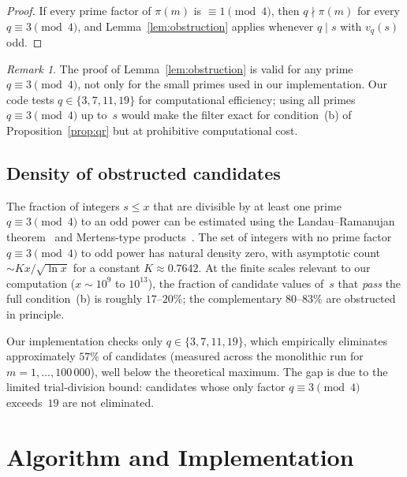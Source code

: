\documentclass{amsart}
\theoremstyle{definition}
\theoremstyle{remark}
\newtheorem{remark}[theorem]{Remark}
\numberwithin{equation}{section}
\newcommand{\vq}[1]{v_{#1}}
\begin{document}
\begin{proof}
If every prime factor of $\pi(m)$ is $\equiv 1 \pmod{4}$, then
$q \nmid \pi(m)$ for every $q \equiv 3 \pmod{4}$, and
Lemma~\ref{lem:obstruction} applies whenever $q \mid s$ with
$\vq{q}(s)$ odd.
\end{proof}

\begin{remark}\label{rem:filter_general}
The proof of Lemma~\ref{lem:obstruction} is valid for any prime
$q \equiv 3 \pmod{4}$, not only for the small primes used in our
implementation.  Our code tests $q \in \{3, 7, 11, 19\}$ for
computational efficiency; using all primes $q \equiv 3 \pmod{4}$
up to~$s$ would make the filter exact for condition~(b) of
Proposition~\ref{prop:qr} but at prohibitive computational cost.
\end{remark}

\subsection{Density of obstructed candidates}

The fraction of integers $s \le x$ that are divisible by at
least one prime $q \equiv 3 \pmod{4}$ to an odd power can be
estimated using the Landau--Ramanujan theorem~\cite{Landau1908}
and Mertens-type products~\cite{Mertens1874,Tenenbaum1995}.
The set of integers with no prime factor $q \equiv 3 \pmod{4}$
to odd power has natural density zero, with asymptotic count
$\sim K x / \sqrt{\ln x}$ for a constant $K \approx 0.7642$.
At the finite scales relevant to our computation ($x \sim 10^{9}$
to $10^{13}$), the fraction of candidate values of~$s$ that
\emph{pass} the full condition~(b) is roughly $17$--$20\%$;
the complementary $80$--$83\%$ are obstructed in principle.

Our implementation checks only $q \in \{3, 7, 11, 19\}$,
which empirically eliminates approximately $57\%$ of candidates
(measured across the monolithic run for $m = 1, \ldots, 100\,000$),
well below the theoretical maximum.  The gap is due to the
limited trial-division bound: candidates whose only factor
$q \equiv 3 \pmod{4}$ exceeds~$19$ are not eliminated.

\section{Algorithm and Implementation}
\label{sec:algorithm}
\end{document}
